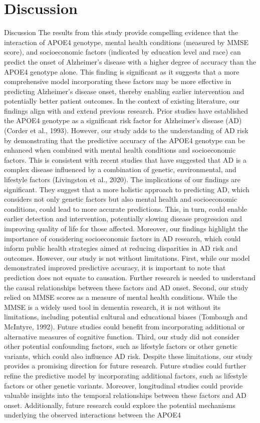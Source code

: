 \documentclass[conference]{IEEEtran}
\begin{document}
\section{Discussion}
Discussion The results from this study provide compelling evidence that the interaction of APOE4 genotype, mental health conditions (measured by MMSE score), and socioeconomic factors (indicated by education level and race) can predict the onset of Alzheimer's disease with a higher degree of accuracy than the APOE4 genotype alone. This finding is significant as it suggests that a more comprehensive model incorporating these factors may be more effective in predicting Alzheimer's disease onset, thereby enabling earlier intervention and potentially better patient outcomes. In the context of existing literature, our findings align with and extend previous research. Prior studies have established the APOE4 genotype as a significant risk factor for Alzheimer's disease (AD) (Corder et al., 1993). However, our study adds to the understanding of AD risk by demonstrating that the predictive accuracy of the APOE4 genotype can be enhanced when combined with mental health conditions and socioeconomic factors. This is consistent with recent studies that have suggested that AD is a complex disease influenced by a combination of genetic, environmental, and lifestyle factors (Livingston et al., 2020). The implications of our findings are significant. They suggest that a more holistic approach to predicting AD, which considers not only genetic factors but also mental health and socioeconomic conditions, could lead to more accurate predictions. This, in turn, could enable earlier detection and intervention, potentially slowing disease progression and improving quality of life for those affected. Moreover, our findings highlight the importance of considering socioeconomic factors in AD research, which could inform public health strategies aimed at reducing disparities in AD risk and outcomes. However, our study is not without limitations. First, while our model demonstrated improved predictive accuracy, it is important to note that prediction does not equate to causation. Further research is needed to understand the causal relationships between these factors and AD onset. Second, our study relied on MMSE scores as a measure of mental health conditions. While the MMSE is a widely used tool in dementia research, it is not without its limitations, including potential cultural and educational biases (Tombaugh and McIntyre, 1992). Future studies could benefit from incorporating additional or alternative measures of cognitive function. Third, our study did not consider other potential confounding factors, such as lifestyle factors or other genetic variants, which could also influence AD risk. Despite these limitations, our study provides a promising direction for future research. Future studies could further refine the predictive model by incorporating additional factors, such as lifestyle factors or other genetic variants. Moreover, longitudinal studies could provide valuable insights into the temporal relationships between these factors and AD onset. Additionally, future research could explore the potential mechanisms underlying the observed interactions between the APOE4 
\end{document}
